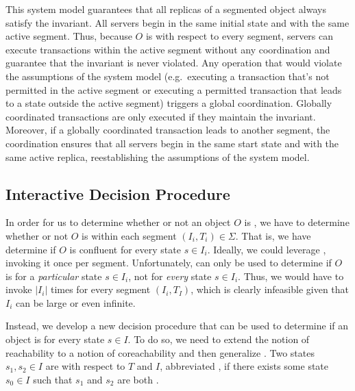 This system model guarantees that all replicas of a segmented
\invariantconfluent{} object always satisfy the invariant. All servers begin in
the same initial state and with the same active segment. Thus, because $O$ is
\invariantconfluent{} with respect to every segment, servers can execute
transactions within the active segment without any coordination and guarantee
that the invariant is never violated. Any operation that would violate the
assumptions of the \invariantconfluence{} system model (e.g.\ executing a
transaction that's not permitted in the active segment or executing a permitted
transaction that leads to a state outside the active segment) triggers a global
coordination. Globally coordinated transactions are only executed if they
maintain the invariant. Moreover, if a globally coordinated transaction leads
to another segment, the coordination ensures that all servers begin in the same
start state and with the same active replica, reestablishing the assumptions of
the \invariantconfluence{} system model.

\subsection{Interactive Decision Procedure}
In order for us to determine whether or not an object $O$ is \sTISconfluent{},
we have to determine whether or not $O$ is \invariantconfluent{} within each
segment $(I_i, T_i) \in \Sigma$. That is, we have determine if $O$ is
 confluent for every state $s \in I_i$. Ideally, we
could leverage , invoking it once per
segment. Unfortunately,  can only be used
to determine if $O$ is  for a \emph{particular} state
$s \in I_i$, not for \emph{every} state $s \in I_i$. Thus, we would have to
invoke  $|I_i|$ times for every segment
$(I_i, T_I)$, which is clearly infeasible given that $I_i$ can be large or even
infinite.

Instead, we develop a new decision procedure that can be used to determine if
an object is  for every state $s \in I$. To do so, we
need to extend the notion of reachability to a notion of coreachability and
then generalize . Two states $s_1, s_2
\in I$ are  with respect to $T$ and $I$, abbreviated
, if there exists some state $s_0 \in I$ such that
$s_1$ and $s_2$ are both \sTIreachable{}.

